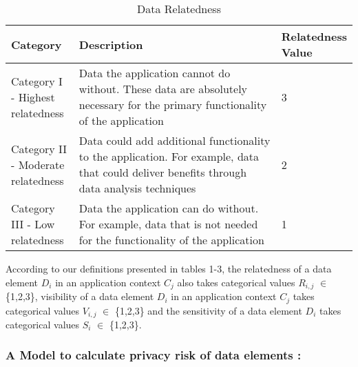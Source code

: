 \documentclass[10pt]{article}
\begin{document}
\begin{center}
\begin{table}[htbp]
\caption{Data Relatedness}
\begin{center}
\begin{adjustbox}{width=0.5\textwidth} 
\begin{tabular}{|p{0.2\linewidth}|p{0.7\linewidth}|p{0.1\linewidth}|} 
\hline
Category & Description & Relatedness Value \\
\hline
Category I - Highest relatedness & Data the application cannot do without. These data are absolutely necessary for the primary functionality of the application & 3 \\
\hline
Category II - Moderate relatedness & Data could add additional functionality to the application. For example, data that could deliver benefits through data analysis techniques & 2 \\
\hline
Category III - Low relatedness & Data the application can do without. For example, data that is not needed for the functionality of the application & 1 \\
\hline
\end{tabular}
\end{adjustbox}
\end{center}
\end{table}
\end{center} 
According to our definitions presented in tables 1-3, the relatedness of a data element \textit {$D_i$} in an application context \textit {$C_j$} also takes categorical values \textit {$R_{i,j}$} $\in$ \{1,2,3\}, visibility of a data element \textit {$D_i$} in an application context \textit {$C_j$} takes categorical values \textit {$V_{i,j}$} $\in$ \{1,2,3\} and the sensitivity of a data element \textit {$D_i$} takes categorical values \textit {$S_i$} $\in$ \{1,2,3\}.

\subsubsection{ A Model to calculate privacy risk of data elements : }
\end{document}
